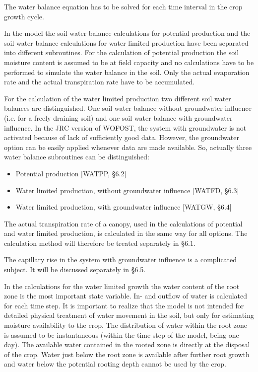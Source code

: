 The water balance equation has to be solved for each time interval in the crop growth cycle.

In the model the soil water balance calculations for potential production and the soil water
balance calculations for water limited production have been separated into different
subroutines. For the calculation of potential production the soil moisture content is
assumed to be at field capacity and no calculations have to be performed to simulate the
water balance in the soil. Only the actual evaporation rate and the actual transpiration rate
have to be accumulated. 

For the calculation of the water limited production two different soil water balances are
distinguished. One soil water balance without groundwater influence (i.e. for a freely
draining soil) and one soil water balance with groundwater influence. In the JRC version
of WOFOST, the system with groundwater is not activated because of lack of sufficiently
good data. However, the groundwater option can be easily applied whenever data are
made available. So, actually three water balance subroutines can be distinguished:
\begin{itemize}
\item Potential production [WATPP, \S  6.2]
\item Water limited production, without groundwater influence [WATFD, \S  6.3]
\item Water limited production, with groundwater influence [WATGW, \S  6.4]
\end{itemize}

The actual transpiration rate of a canopy, used in the calculations of potential and water
limited production, is calculated in the same way for all options. The calculation method
will therefore be treated separately in \S 6.1. 

The capillary rise in the system with groundwater influence is a complicated subject. It
will be discussed separately in \S 6.5.

In the calculations for the water limited growth the water content of the root zone is the
most important state variable. In- and outflow of water is calculated for each time step. It
is important to realize that the model is not intended for detailed physical treatment of
water movement in the soil, but only for estimating moisture availability to the crop. The
distribution of water within the root zone is assumed to be instantaneous (within the time
step of the model, being one day). The available water contained in the rooted zone is
directly at the disposal of the crop. Water just below the root zone is available after
further root growth and water below the potential rooting depth cannot be used by the
crop.


